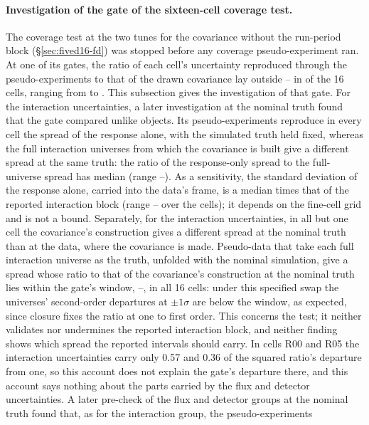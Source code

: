 \paragraph{Investigation of the gate of the sixteen-cell coverage test.}
\label{sec:cov1b-gate}
The coverage test at the two tunes for the covariance without the run-period block (\S\ref{sec:fived16-fd}) was stopped before any coverage pseudo-experiment ran. At one of its gates, the ratio of each cell's uncertainty reproduced through the pseudo-experiments to that of the drawn covariance lay outside -- in  of the 16 cells, ranging from  to . This subsection gives the investigation of that gate. For the interaction uncertainties, a later investigation at the nominal truth found that the gate compared unlike objects. Its pseudo-experiments reproduce in every cell the spread of the response alone, with the simulated truth held fixed, whereas the full interaction universes from which the covariance is built give a different spread at the same truth: the ratio of the response-only spread to the full-universe spread has median  (range --). As a sensitivity, the standard deviation of the response alone, carried into the data's frame, is a median  times that of the reported interaction block (range -- over the cells); it depends on the fine-cell grid and is not a bound. Separately, for the interaction uncertainties, in all but one cell the covariance's construction gives a different spread at the nominal truth than at the data, where the covariance is made. Pseudo-data that take each full interaction universe as the truth, unfolded with the nominal simulation, give a spread whose ratio to that of the covariance's construction at the nominal truth lies within the gate's window, --, in all 16 cells: under this specified swap the universes' second-order departures at $\pm1\sigma$ are below the window, as expected, since closure fixes the ratio at one to first order. This concerns the test; it neither validates nor undermines the reported interaction block, and neither finding shows which spread the reported intervals should carry. In cells R00 and R05 the interaction uncertainties carry only 0.57 and 0.36 of the squared ratio's departure from one, so this account does not explain the gate's departure there, and this account says nothing about the parts carried by the flux and detector uncertainties. A later pre-check of the flux and detector groups at the nominal truth found that, as for the interaction group, the pseudo-experiments 